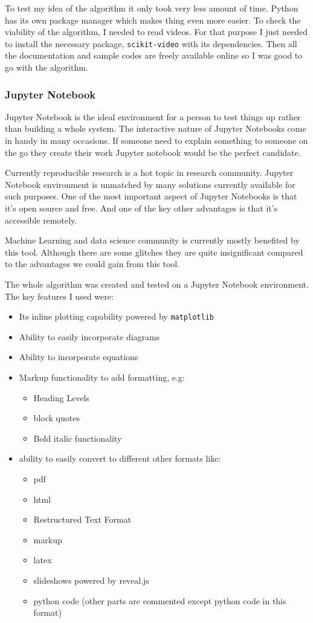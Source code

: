 To test my idea of the algorithm it only took very less amount of time. Python has its own package manager which makes thing even more easier. To check the viability of the algorithm, I needed to read videos. For that purpose I just needed to install the necessary package, \texttt{scikit-video} with its dependencies. Then all the documentation and sample codes are freely available online so I was good to go with the algorithm.

\subsubsection{Jupyter Notebook}

Jupyter Notebook is the ideal environment for a person to test things up rather than building a whole system. The interactive nature of Jupyter Notebooks come in handy in many occasions. If someone need to explain something to someone on the go they create their work Jupyter notebook would be the perfect candidate. 

Currently reproducible research is a hot topic in research community. Jupyter Notebook environment is unmatched by many solutions currently available for such purposes. One of the most important aspect of Jupyter Notebooks is that it's open source and free. And one of the key other advantages is that it's accessible remotely. 

Machine Learning and data science community is currently mostly benefited by this tool. Although there are some glitches they are quite insignificant compared to the advantages we could gain from this tool.

The whole algorithm was created and tested on a Jupyter Notebook environment. The key features I used were: 
\begin{itemize}
\item Its inline plotting capability powered by \texttt{matplotlib}
\item Ability to easily incorporate diagrams
\item Ability to incorporate equations
\item Markup functionality to add formatting, e.g:
	\begin{itemize}
	\item Heading Levels
	\item block quotes
	\item Bold italic functionality
	\end{itemize}
\item ability to easily convert to different other formats like:
	\begin{itemize}
	\item pdf
	\item html
	\item Restructured Text Format
	\item markup
	\item latex
	\item slideshows powered by reveal.js
	\item python code (other parts are commented except python code in this format)
	\end{itemize}
\end{itemize}


